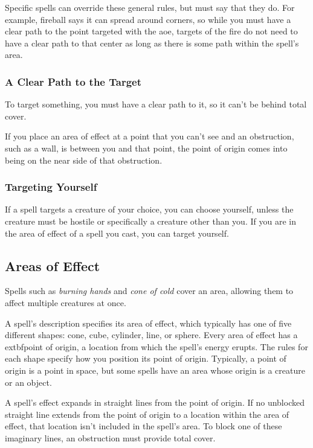 Specific spells can override these general rules, but must say that they do. For example, fireball says it can spread around corners, so while you must have a clear path to the point targeted with the aoe, targets of the fire do not need to have a clear path to that center as long as there is some path within the spell's area.

\subsubsection{A Clear Path to the Target}

To target something, you must have a clear path to it, so it can't be behind total cover.

If you place an area of effect at a point that you can't see and an obstruction, such as a wall, is between you and that point, the point of origin comes into being on the near side of that obstruction.

\subsubsection{Targeting Yourself}

If a spell targets a creature of your choice, you can choose yourself, unless the creature must be hostile or specifically a creature other than you. If you are in the area of effect of a spell you cast, you can target yourself.

\subsection{Areas of Effect}\label{subsec:areas-of-effect}

Spells such as \textit{burning hands} and \textit{cone of cold} cover an area, allowing them to affect multiple creatures at once.

A spell's description specifies its area of effect, which typically has one of five different shapes: cone, cube, cylinder, line, or sphere. Every area of effect has a 	extbf{point of origin}, a location from which the spell's energy erupts. The rules for each shape specify how you position its point of origin. Typically, a point of origin is a point in space, but some spells have an area whose origin is a creature or an object.

A spell's effect expands in straight lines from the point of origin. If no unblocked straight line extends from the point of origin to a location within the area of effect, that location isn't included in the spell's area. To block one of these imaginary lines, an obstruction must provide total cover.

